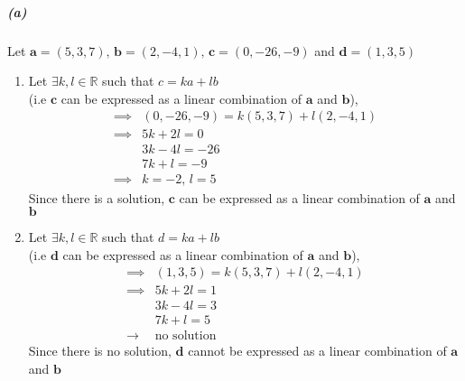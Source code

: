 \documentclass[12pt, letterpaper]{article}
\begin{document}
\subparagraph{(a)}
Let $\mathbf{a} = (5,3,7),\,\mathbf{b} = (2,-4,1),\,\mathbf{c} = (0,-26,-9)$ and $\mathbf{d} = (1,3,5)$\\


\begin{enumerate}
  \item Let $\exists k,l\in\mathbb{R}$ such that $c = ka + lb$\\
  (i.e $\mathbf{c}$ can be expressed as a linear combination of $\mathbf{a}$ and $\mathbf{b}$),
  \[\begin{split}
    \implies &(0,-26,-9) = k(5,3,7) + l(2,-4,1)\\
    \implies &5k + 2l = 0\\
            &3k -4l = -26\\
            &7k + l = -9\\
    \implies &\boxed{k = -2,\, l = 5}
  \end{split} \]
  Since there is a solution, $\mathbf{c}$ can be expressed as a linear combination of $\mathbf{a}$ and $\mathbf{b}$

  \item Let $\exists k,l\in\mathbb{R}$ such that $d = ka + lb$\\
  (i.e $\mathbf{d}$ can be expressed as a linear combination of $\mathbf{a}$ and $\mathbf{b}$),
  \[\begin{split}
    \implies &(1,3,5) = k(5,3,7) + l(2,-4,1)\\
    \implies &5k + 2l = 1\\
            &3k -4l = 3\\
            &7k + l = 5\\
    \to\,\, &\boxed{\text{no solution}}
  \end{split} \]
  Since there is no solution, $\mathbf{d}$ cannot be expressed as a linear combination of $\mathbf{a}$ and $\mathbf{b}$
\end{enumerate}

\end{document}
